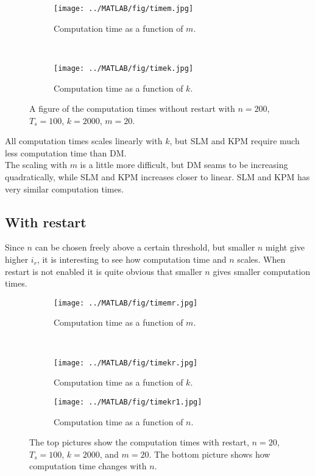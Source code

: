 \begin{figure}[H]
        \centering
        \begin{subfigure}[b]{0.45\textwidth}
                \texttt{[image: ../MATLAB/fig/timem.jpg]}
                \caption{ Computation time as a function of $m$. }
                \label{fig:timem}
        \end{subfigure}
        ~
        \begin{subfigure}[b]{0.45\textwidth}
                \texttt{[image: ../MATLAB/fig/timek.jpg]}
                \caption{ Computation time as a function of $k$. }
                \label{fig:timek}
        \end{subfigure}
        \caption{ A figure of the computation times without restart with $n = 200$, $T_s = 100$, $k = 2000$, $m = 20$. }
        \label{fig:time0}
\end{figure}
All computation times scales linearly with $k$, but SLM and KPM require much less computation time than DM. \\
The scaling with $m$ is a little more difficult, but DM seams to be increasing quadratically, while SLM and KPM increases closer to linear. SLM and KPM has very similar computation times.
\subsection{With restart}
Since $n$ can be chosen freely above a certain threshold, but smaller $n$ might give higher $i_r$, it is interesting to see how computation time and $n$ scales. When restart is not enabled it is quite obvious that smaller $n$ gives smaller computation times.\\
\begin{figure}[H]
        \centering
        \begin{subfigure}[b]{0.45\textwidth}
                \texttt{[image: ../MATLAB/fig/timemr.jpg]}
                \caption{ Computation time as a function of $m$. }
                \label{fig:timemr}
        \end{subfigure}
        ~
        \begin{subfigure}[b]{0.45\textwidth}
                \texttt{[image: ../MATLAB/fig/timekr.jpg]}
                \caption{ Computation time as a function of $k$. }
                \label{fig:timekr}
        \end{subfigure}
        
        \begin{subfigure}[b]{0.45\textwidth}
                \texttt{[image: ../MATLAB/fig/timekr1.jpg]}
                \caption{ Computation time as a function of $n$. }
                \label{fig:timekr1}
        \end{subfigure}        
        
        \caption{ The top pictures show the computation times with restart, $n = 20$, $T_s = 100$, $k = 2000$, and $m = 20$. The bottom picture shows how computation time changes with $n$. }
        \label{fig:time1}
\end{figure}

